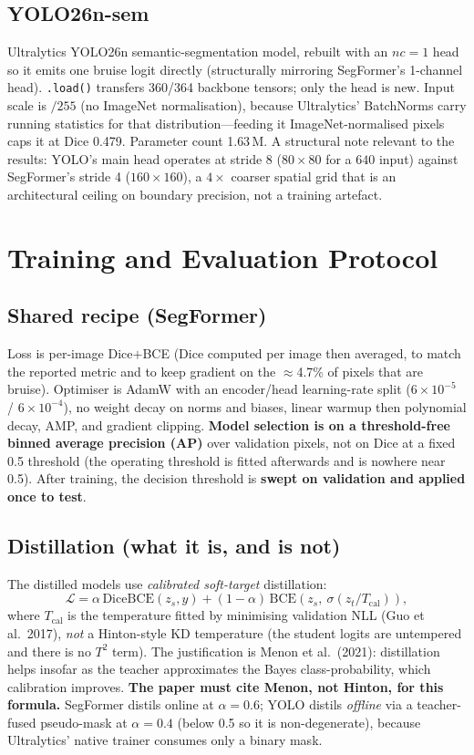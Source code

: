 \documentclass[11pt]{article}
\begin{document}
\subsection{YOLO26n-sem}
Ultralytics YOLO26n semantic-segmentation model, rebuilt with an $nc{=}1$ head so
it emits one bruise logit directly (structurally mirroring SegFormer's 1-channel
head). \texttt{.load()} transfers 360/364 backbone tensors; only the head is new.
Input scale is $/255$ (no ImageNet normalisation), because Ultralytics'
BatchNorms carry running statistics for that distribution---feeding it
ImageNet-normalised pixels caps it at Dice 0.479. Parameter count 1.63\,M. A
structural note relevant to the results: YOLO's main head operates at stride 8
($80\times80$ for a $640$ input) against SegFormer's stride 4 ($160\times160$), a
$4\times$ coarser spatial grid that is an architectural ceiling on boundary
precision, not a training artefact.

\section{Training and Evaluation Protocol}
\subsection{Shared recipe (SegFormer)}
Loss is per-image Dice$+$BCE (Dice computed per image then averaged, to match the
reported metric and to keep gradient on the $\approx$4.7\% of pixels that are
bruise). Optimiser is AdamW with an encoder/head learning-rate split
($6\times10^{-5}$ / $6\times10^{-4}$), no weight decay on norms and biases,
linear warmup then polynomial decay, AMP, and gradient clipping. \textbf{Model
selection is on a threshold-free binned average precision (AP)} over validation
pixels, not on Dice at a fixed 0.5 threshold (the operating threshold is fitted
afterwards and is nowhere near 0.5). After training, the decision threshold is
\textbf{swept on validation and applied once to test}.

\subsection{Distillation (what it is, and is not)}
The distilled models use \emph{calibrated soft-target} distillation:
\[
\mathcal{L} = \alpha\,\mathrm{DiceBCE}(z_s, y)
            + (1-\alpha)\,\mathrm{BCE}\!\left(z_s,\ \sigma(z_t / T_\text{cal})\right),
\]
where $T_\text{cal}$ is the temperature fitted by minimising validation NLL
(Guo et al.\ 2017), \emph{not} a Hinton-style KD temperature (the student logits
are untempered and there is no $T^2$ term). The justification is Menon et al.\
(2021): distillation helps insofar as the teacher approximates the Bayes
class-probability, which calibration improves. \textbf{The paper must cite Menon,
not Hinton, for this formula.} SegFormer distils online at $\alpha=0.6$; YOLO
distils \emph{offline} via a teacher-fused pseudo-mask at $\alpha=0.4$ (below 0.5
so it is non-degenerate), because Ultralytics' native trainer consumes only a
binary mask.
\end{document}
